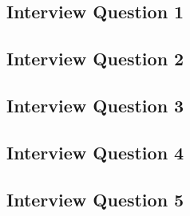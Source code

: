 \subsection{Interview Question 1}

\subsection{Interview Question 2}

\subsection{Interview Question 3}

\subsection{Interview Question 4}

\subsection{Interview Question 5}



